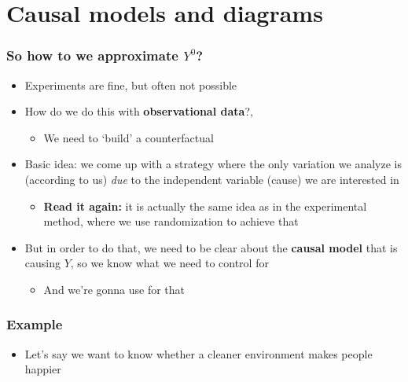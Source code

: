 \section{Causal models and diagrams}

\begin{frame}
\frametitle{So how to we approximate $Y^{0}$?}
\centering

\begin{itemize}
  \item Experiments are fine, but often not possible
  \item<2-> How do we do this with \textbf{observational data}?,
    \begin{itemize}
      \item We need to `build' a counterfactual
    \end{itemize}
  \item<3-> Basic idea: we come up with a strategy where the only variation we analyze is (according to us) \textit{due} to the independent variable (cause) we are interested in
  \begin{itemize}
    \item \textbf{Read it again:} it is actually the same idea as in the experimental method, where we use randomization to achieve that
  \end{itemize}
  \item<4-> But in order to do that, we need to be clear about the \textbf{causal model} that is causing $Y$, so we know what we need to control for
  \begin{itemize}
    \item And we're gonna use  for that
  \end{itemize}
\end{itemize}

\end{frame}
\note{}

\begin{frame}
\frametitle{Example}
\centering

\begin{itemize}
\item Let's say we want to know whether a cleaner environment makes people happier
\end{itemize}

\end{frame}
\note{}

